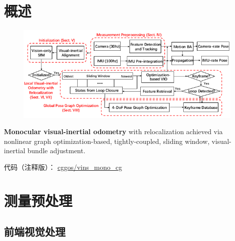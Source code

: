 \documentclass[12pt,a4paper]{article}
\begin{document}
\maketitle
\tableofcontents

\noindent
\setlength{\parindent}{2em}
\setlength{\parskip}{0.3em}
\linespread{1}

\section{概述} 

\begin{figure}[htbp]
\centering
\includegraphics[scale=0.6]{images/vins_mono_framework.png}
\end{figure}

\textbf{Monocular visual-inertial odometry} with relocalization achieved via nonlinear graph optimization-based, tightly-coupled, sliding window, visual-inertial bundle adjustment. \cite{qin2017vins}

代码（注释版）： \href{https://github.com/cggos/vins_mono_cg}{cggos/vins\_mono\_cg} 

\section{测量预处理} 

\subsection{前端视觉处理}
\end{document}
